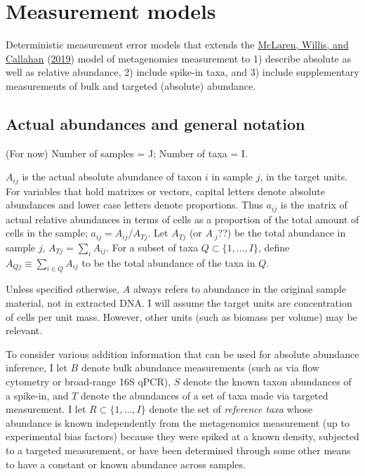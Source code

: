 \documentclass[
]{article}
\theoremstyle{definition}
\theoremstyle{definition}
\theoremstyle{definition}
\theoremstyle{definition}
\theoremstyle{remark}
\begin{document}
\hypertarget{appendix-appendix}{%
\appendix {}}


\hypertarget{models}{%
\section{Measurement models}\label{models}}

Deterministic measurement error models that extends the \protect\hyperlink{ref-mclaren2019cons}{McLaren, Willis, and Callahan} (\protect\hyperlink{ref-mclaren2019cons}{2019}) model of metagenomics measurement to 1) describe absolute as well as relative abundance, 2) include spike-in taxa, and 3) include supplementary measurements of bulk and targeted (absolute) abundance.

\hypertarget{actual-abundances-and-general-notation}{%
\subsection{Actual abundances and general notation}\label{actual-abundances-and-general-notation}}

(For now) Number of samples = J; Number of taxa = I.

\(A_{ij}\) is the actual absolute abundance of taxon \(i\) in sample \(j\), in the target units.
For variables that hold matrixes or vectors, capital letters denote absolute abundances and lower case letters denote proportions.
Thus \(a_{ij}\) is the matrix of actual relative abundances in terms of cells as a proportion of the total amount of cells in the sample; \(a_{ij} = A_{ij} / A_{Tj}\).
Let \(A_{Tj}\) (or \(A_{\cdot j}\)??) be the total abundance in sample \(j\), \(A_{Tj} = \sum_i A_{ij}\).
For a subset of taxa \(Q \subset \{1, \dots, I\}\), define \(A_{Qj} \equiv \sum_{i \in Q} A_{ij}\) to be the total abundance of the taxa in \(Q\).

Unless specified otherwise, \(A\) always refers to abundance in the original sample material, not in extracted DNA.
I will assume the target units are concentration of cells per unit mass. However, other units (such as biomass per volume) may be relevant.

To consider various addition information that can be used for absolute abundance inference, I let \(B\) denote bulk abundance measurements (such as via flow cytometry or broad-range 16S qPCR), \(S\) denote the known taxon abundances of a spike-in, and \(T\) denote the abundances of a set of taxa made via targeted measurement.
I let \(R \subset \{1, \dots, I\}\) denote the set of \emph{reference taxa} whose abundance is known independently from the metagenomics measurement (up to experimental bias factors) because they were spiked at a known density, subjected to a targeted measurement, or have been determined through some other means to have a constant or known abundance across samples.
\end{document}
